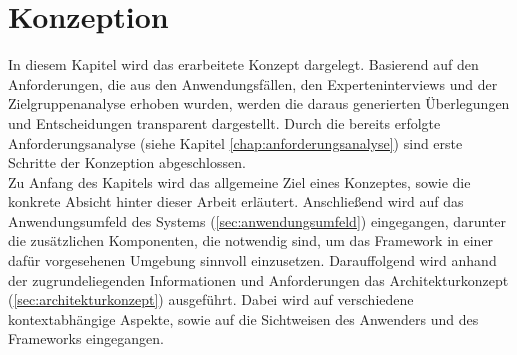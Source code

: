 \chapter{Konzeption}
\label{chap:konzept}
    In diesem Kapitel wird das erarbeitete Konzept dargelegt. Basierend auf den 
    Anforderungen, die aus den Anwendungsfällen, den Experteninterviews und der Zielgruppenanalyse 
    erhoben wurden, werden die daraus generierten Überlegungen und Entscheidungen transparent 
    dargestellt. Durch die bereits erfolgte Anforderungsanalyse (siehe Kapitel \ref{chap:anforderungsanalyse})
    sind erste Schritte der Konzeption abgeschlossen. 
    \\
    Zu Anfang des Kapitels wird das allgemeine Ziel eines Konzeptes, sowie die konkrete Absicht hinter dieser Arbeit 
    erläutert. Anschließend 
    wird auf das Anwendungsumfeld des Systems (\ref{sec:anwendungsumfeld}) eingegangen, darunter die
    zusätzlichen Komponenten, die notwendig sind, um das Framework in einer dafür vorgesehenen Umgebung sinnvoll 
    einzusetzen. Darauffolgend wird anhand der zugrundeliegenden Informationen und Anforderungen das 
    Architekturkonzept (\ref{sec:architekturkonzept}) ausgeführt. 
    Dabei wird auf verschiedene kontextabhängige Aspekte, sowie auf die Sichtweisen des Anwenders und des Frameworks eingegangen.



